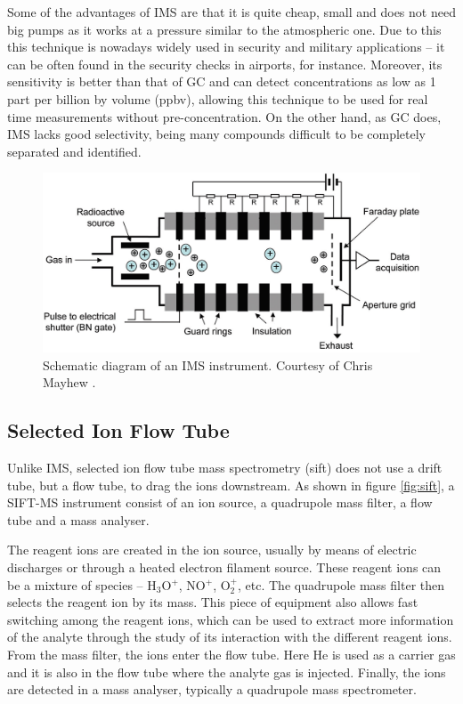 Some of the advantages of IMS are that it is quite cheap, small and does not need big pumps as it works at a pressure similar to the atmospheric one. Due to this this technique is nowadays widely used in security and military applications – it can be often found in the security checks in airports, for instance. Moreover, its sensitivity is better than that of GC and can detect concentrations as low as 1 part per billion by volume (ppbv), allowing this technique to be used for real time measurements without pre-concentration. On the other hand, as GC does, IMS lacks good selectivity, being many compounds difficult to be completely separated and identified.

\begin{figure}%
\centering
    \includegraphics[width=0.7\linewidth]{pics/ims.png}
    \caption{Schematic diagram of an IMS instrument. Courtesy of Chris Mayhew \cite{ellis2013proton}.}
    \label{fig:ims}
\end{figure}

\subsection{Selected Ion Flow Tube}
Unlike IMS, selected ion flow tube mass spectrometry (\acrshort{sift}) does not use a drift tube, but a flow tube, to drag the ions downstream. As shown in figure \ref{fig:sift}, a SIFT-MS instrument consist of an ion source, a quadrupole mass filter, a flow tube and a mass analyser.

The reagent ions are created in the ion source, usually by means of electric discharges or through a heated electron filament source. These reagent ions can be a mixture of species – H$_3$O$^+$, NO$^+$, O$_2^+$, etc.  The quadrupole mass filter then selects the reagent ion by its mass. This piece of equipment also allows fast switching among the reagent ions, which can be used to extract more information of the analyte through the study of its interaction with the different reagent ions. From the mass filter, the ions enter the flow tube. Here He is used as a carrier gas and it is also in the flow tube where the analyte gas is injected. Finally, the ions are detected in a mass analyser, typically a quadrupole mass spectrometer.

